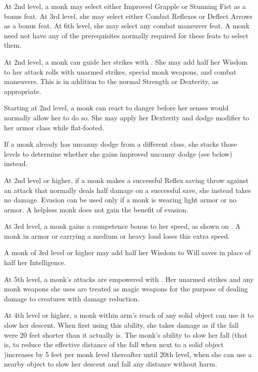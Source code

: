  At 2nd level, a monk may select either Improved Grapple or Stunning Fist as a bonus feat. At 3rd level, she may select either Combat Reflexes or Deflect Arrows as a bonus feat. At 6th level, she may select any combat maneuver feat. A monk need not have any of the prerequisites normally required for these feats to select them.

 At 2nd level, a monk can guide her strikes with \ki. She may add half her Wisdom to her attack rolls with unarmed strikes, special monk weapons, and combat maneuvers. This is in addition to the normal Strength or Dexterity, as appropriate.

 Starting at 2nd level, a monk can react to danger before her senses would normally allow her to do so. She may apply her Dexterity and dodge modifier to her armor class while flat-footed.

If a monk already has uncanny dodge from a different class, she stacks those levels to determine whether she gains improved uncanny dodge (see below) instead.

 At 2nd level or higher, if a monk makes a successful Reflex saving throw against an attack that normally deals half damage on a successful save, she instead takes no damage. Evasion can be used only if a monk is wearing light armor or no armor. A helpless monk does not gain the benefit of evasion.

 At 3rd level, a monk gains a competence bonus to her speed, as shown on . A monk in armor or carrying a medium or heavy load loses this extra speed.

 A monk of 3rd level or higher may add half her Wisdom to Will saves in place of half her Intelligence.

 At 5th level, a monk's attacks are empowered with \ki. Her unarmed strikes and any monk weapons she uses are treated as magic weapons for the purpose of dealing damage to creatures with damage reduction.

  At 4th level or higher, a monk within arm's reach of any solid object can use it to slow her descent. When first using this ability, she takes damage as if the fall were 20 feet shorter than it actually is. The monk's ability to slow her fall (that is, to reduce the effective distance of the fall when next to a solid object )increases by 5 feet per monk level thereafter until 20th level, when she can use a nearby object to slow her descent and fall any distance without harm.

